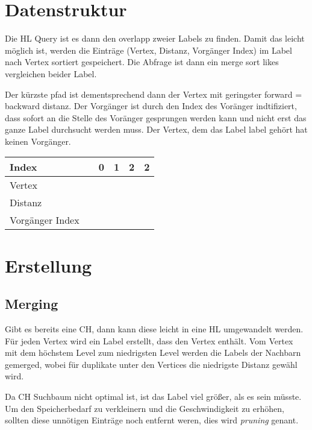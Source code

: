 \section{Datenstruktur}

Die HL Query ist es dann den overlapp zweier Labels zu finden.
Damit das leicht möglich ist, werden die Einträge (Vertex, Distanz, Vorgänger Index) im Label nach Vertex sortiert gespeichert.
Die Abfrage ist dann ein merge sort likes vergleichen beider Label.

Der kürzste pfad ist dementsprechend dann der Vertex mit geringster forward = backward distanz.
Der Vorgänger ist durch den Index des Voränger indtifiziert, dass sofort an die Stelle des Voränger gesprungen werden kann und nicht erst das ganze Label durchsucht werden muss.
Der Vertex, dem das Label label gehört hat keinen Vorgänger.

\begin{table}[ht]
    \centering
    \begin{tabular}{@{}llllll@{}}
        \toprule
        Index           &  & 0 & 1 & 2 & 2 \\ \midrule
        Vertex          &  &   &   &   &   \\
        Distanz         &  &   &   &   &   \\
        Vorgänger Index &  &   &   &   &   \\ \bottomrule
    \end{tabular}
\end{table}



\section{Erstellung}

\subsection{Merging}
Gibt es bereits eine CH, dann kann diese leicht in eine HL umgewandelt werden.
Für jeden Vertex wird ein Label erstellt, dass den Vertex enthält.
Vom Vertex mit dem höchstem Level zum niedrigsten Level werden die Labels der Nachbarn gemerged, wobei für duplikate unter den Vertices die niedrigste Distanz gewähl wird.

Da CH Suchbaum nicht optimal ist, ist das Label viel größer, als es sein müsste.
Um den Speicherbedarf zu verkleinern und die Geschwindigkeit zu erhöhen, sollten diese unnötigen Einträge noch entfernt weren, dies wird \emph{pruning} genant.

